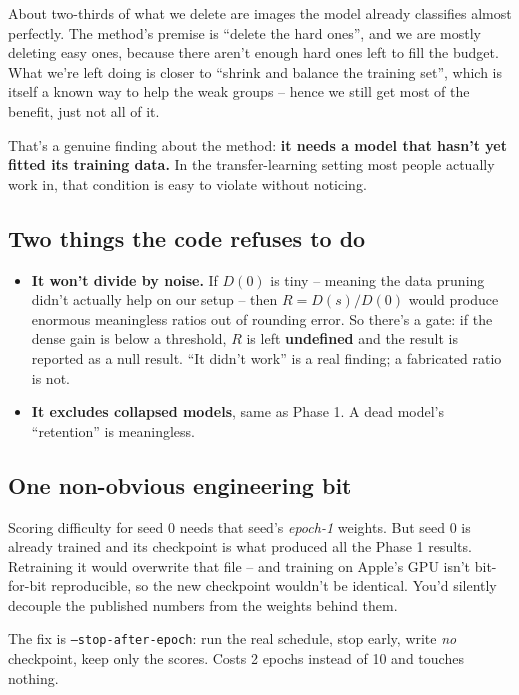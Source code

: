 \documentclass[11pt]{article}
\newcommand{\code}[1]{\texttt{\small #1}}
\begin{document}
\noindent About two-thirds of what we delete are images the model already
classifies almost perfectly. The method's premise is ``delete the hard ones'',
and we are mostly deleting easy ones, because there aren't enough hard ones left
to fill the budget. What we're left doing is closer to ``shrink and balance the
training set'', which is itself a known way to help the weak groups -- hence we
still get most of the benefit, just not all of it.

That's a genuine finding about the method: \textbf{it needs a model that hasn't
yet fitted its training data.} In the transfer-learning setting most people
actually work in, that condition is easy to violate without noticing.

\subsection{Two things the code refuses to do}

\begin{itemize}[leftmargin=1.4em]
\item \textbf{It won't divide by noise.} If $D(0)$ is tiny -- meaning the data
pruning didn't actually help on our setup -- then $R = D(s)/D(0)$ would produce
enormous meaningless ratios out of rounding error. So there's a gate: if the
dense gain is below a threshold, $R$ is left \textbf{undefined} and the result is
reported as a null result. ``It didn't work'' is a real finding; a fabricated
ratio is not.

\item \textbf{It excludes collapsed models}, same as Phase 1. A dead model's
``retention'' is meaningless.
\end{itemize}

\subsection{One non-obvious engineering bit}

Scoring difficulty for seed 0 needs that seed's \emph{epoch-1} weights. But seed
0 is already trained and its checkpoint is what produced all the Phase 1
results. Retraining it would overwrite that file -- and training on Apple's GPU
isn't bit-for-bit reproducible, so the new checkpoint wouldn't be identical.
You'd silently decouple the published numbers from the weights behind them.

The fix is \code{--stop-after-epoch}: run the real schedule, stop early, write
\emph{no} checkpoint, keep only the scores. Costs 2 epochs instead of 10 and
touches nothing.
\end{document}

